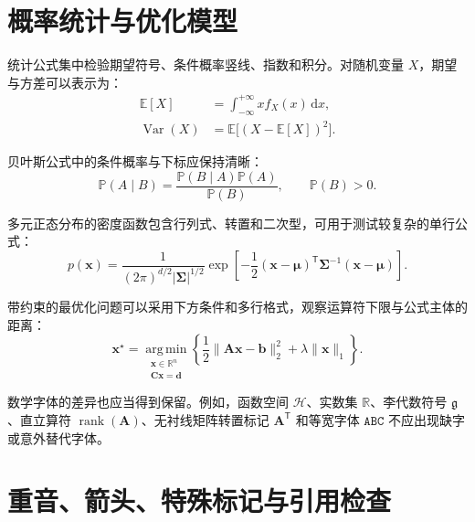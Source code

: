 \section{概率统计与优化模型}
\label{sec:formula-probability}

统计公式集中检验期望符号、条件概率竖线、指数和积分。对随机变量 $X$，期望与方差可以表示为：
\begin{align}
  \mathbb{E}[X]
    &=\int_{-\infty}^{+\infty}x f_X(x)\,\mathrm{d}x,
      \label{eq:test-expectation}\\
  \operatorname{Var}(X)
    &=\mathbb{E}\bigl[(X-\mathbb{E}[X])^2\bigr].
      \label{eq:test-variance}
\end{align}

贝叶斯公式中的条件概率与下标应保持清晰：
\begin{equation}
  \label{eq:test-bayes}
  \mathbb{P}(A\mid B)
  =\frac{\mathbb{P}(B\mid A)\mathbb{P}(A)}{\mathbb{P}(B)},
  \qquad \mathbb{P}(B)>0.
\end{equation}

多元正态分布的密度函数包含行列式、转置和二次型，可用于测试较复杂的单行公式：
\begin{equation}
  \label{eq:test-gaussian}
  p(\boldsymbol{x})
  =\frac{1}{(2\pi)^{d/2}|\boldsymbol{\Sigma}|^{1/2}}
   \exp\!\left[-\frac{1}{2}
     (\boldsymbol{x}-\boldsymbol{\mu})^{\mathsf{T}}
     \boldsymbol{\Sigma}^{-1}
     (\boldsymbol{x}-\boldsymbol{\mu})\right].
\end{equation}

带约束的最优化问题可以采用下方条件和多行格式，观察运算符下限与公式主体的距离：
\begin{equation}
  \label{eq:test-argmin}
  \boldsymbol{x}^{\star}
  =\operatorname*{arg\,min}_{\substack{\boldsymbol{x}\in\mathbb{R}^{n}\\
                             \boldsymbol{C}\boldsymbol{x}=\boldsymbol{d}}}
    \left\{\frac{1}{2}\lVert\boldsymbol{A}\boldsymbol{x}-\boldsymbol{b}\rVert_2^2
    +\lambda\lVert\boldsymbol{x}\rVert_1\right\}.
\end{equation}

数学字体的差异也应当得到保留。例如，函数空间 $\mathcal{H}$、实数集 $\mathbb{R}$、李代数符号 $\mathfrak{g}$、直立算符 $\operatorname{rank}(\boldsymbol{A})$、无衬线矩阵转置标记 $\boldsymbol{A}^{\mathsf{T}}$ 和等宽字体 $\mathtt{ABC}$ 不应出现缺字或意外替代字体。

\section{重音、箭头、特殊标记与引用检查}
\label{sec:formula-special}

